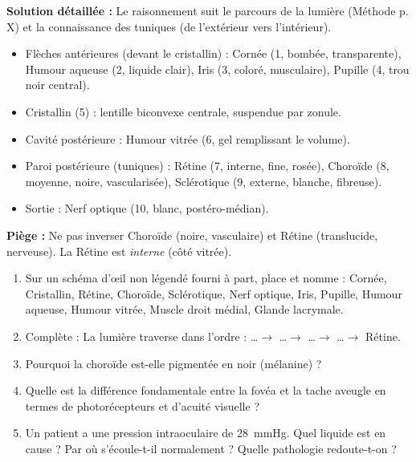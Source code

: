 \documentclass[11pt]{article}
\begin{document}
\begin{exoresolu}
\textbf{Solution détaillée :} Le raisonnement suit le parcours de la lumière (Méthode p. X) et la connaissance des tuniques (de l'extérieur vers l'intérieur).
\begin{itemize}
\item Flèches antérieures (devant le cristallin) : Cornée (1, bombée, transparente), Humour aqueuse (2, liquide clair), Iris (3, coloré, musculaire), Pupille (4, trou noir central).
\item Cristallin (5) : lentille biconvexe centrale, suspendue par zonule.
\item Cavité postérieure : Humour vitrée (6, gel remplissant le volume).
\item Paroi postérieure (tuniques) : Rétine (7, interne, fine, rosée), Choroïde (8, moyenne, noire, vascularisée), Sclérotique (9, externe, blanche, fibreuse).
\item Sortie : Nerf optique (10, blanc, postéro-médian).
\end{itemize}
\textbf{Piège :} Ne pas inverser Choroïde (noire, vasculaire) et Rétine (translucide, nerveuse). La Rétine est \emph{interne} (côté vitrée).
\end{exoresolu}

\begin{exercice}
\begin{enumerate}
\item Sur un schéma d'œil non légendé fourni à part, place et nomme : Cornée, Cristallin, Rétine, Choroïde, Sclérotique, Nerf optique, Iris, Pupille, Humour aqueuse, Humour vitrée, Muscle droit médial, Glande lacrymale.
\item Complète : La lumière traverse dans l'ordre : \ldots $\to$ \ldots $\to$ \ldots $\to$ \ldots $\to$ Rétine.
\item Pourquoi la choroïde est-elle pigmentée en noir (mélanine) ?
\item Quelle est la différence fondamentale entre la fovéa et la tache aveugle en termes de photorécepteurs et d'acuité visuelle ?
\item Un patient a une pression intraoculaire de \SI{28}{mmHg}. Quel liquide est en cause ? Par où s'écoule-t-il normalement ? Quelle pathologie redoute-t-on ?
\end{enumerate}
\end{exercice}
\end{document}
